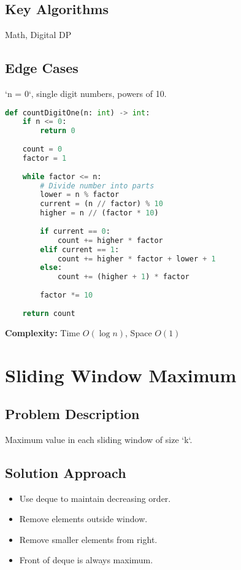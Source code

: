 \documentclass[10pt, a4paper]{article}
\begin{document}
\subsection*{Key Algorithms}
Math, Digital DP

\subsection*{Edge Cases}
`n = 0`, single digit numbers, powers of 10.

\begin{lstlisting}[language=Python]
def countDigitOne(n: int) -> int:
    if n <= 0:
        return 0
    
    count = 0
    factor = 1
    
    while factor <= n:
        # Divide number into parts
        lower = n % factor
        current = (n // factor) % 10
        higher = n // (factor * 10)
        
        if current == 0:
            count += higher * factor
        elif current == 1:
            count += higher * factor + lower + 1
        else:
            count += (higher + 1) * factor
        
        factor *= 10
    
    return count
\end{lstlisting}
\textbf{Complexity:} Time $O(\log n)$, Space $O(1)$

\section{Sliding Window Maximum}
\subsection*{Problem Description}
Maximum value in each sliding window of size `k`.

\subsection*{Solution Approach}
\begin{itemize}
    \item Use deque to maintain decreasing order.
    \item Remove elements outside window.
    \item Remove smaller elements from right.
    \item Front of deque is always maximum.
\end{itemize}
\end{document}

